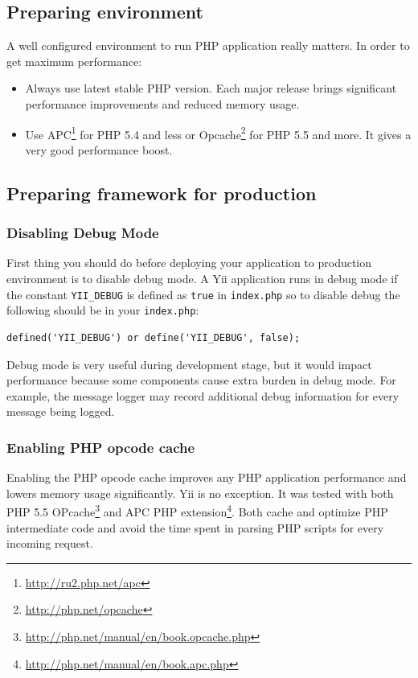 \subsection{Preparing environment}
A well configured environment to run PHP application really matters. In order to get maximum performance:

\begin{itemize}
\item Always use latest stable PHP version. Each major release brings significant performance improvements and reduced
memory usage.
\item Use APC\footnote{\url{http://ru2.php.net/apc}} for PHP 5.4 and less or Opcache\footnote{\url{http://php.net/opcache}} for PHP 5.5 and more. It
gives a very good performance boost.
\end{itemize}
\subsection{Preparing framework for production}
\subsubsection{Disabling Debug Mode}
First thing you should do before deploying your application to production environment
is to disable debug mode. A Yii application runs in debug mode if the constant
\lstinline|YII_DEBUG| is defined as \lstinline|true| in \lstinline|index.php| so to disable debug the following
should be in your \lstinline|index.php|:

\lstset{language=php}\begin{lstlisting}
defined('YII_DEBUG') or define('YII_DEBUG', false);
\end{lstlisting}
Debug mode is very useful during development stage, but it would impact performance
because some components cause extra burden in debug mode. For example, the message
logger may record additional debug information for every message being logged.

\subsubsection{Enabling PHP opcode cache}
Enabling the PHP opcode cache improves any PHP application performance and lowers
memory usage significantly. Yii is no exception. It was tested with both
PHP 5.5 OPcache\footnote{\url{http://php.net/manual/en/book.opcache.php}} and
APC PHP extension\footnote{\url{http://php.net/manual/en/book.apc.php}}. Both cache
and optimize PHP intermediate code and avoid the time spent in parsing PHP
scripts for every incoming request.

